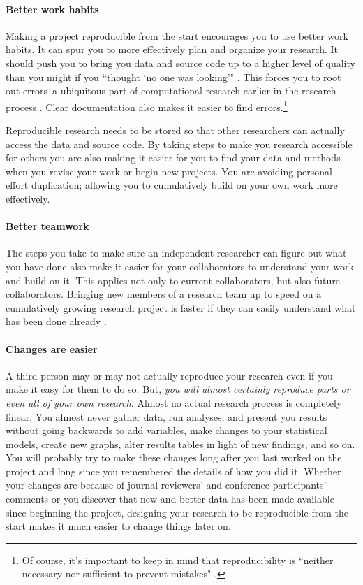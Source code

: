 \documentclass[krantz1]{krantz}
\begin{document}
\paragraph{Better work habits}
Making a project reproducible from the start encourages you to use better work habits. It can spur you to more effectively plan and organize your research. It should push you to bring you data and source code up to a higher level of quality than you might if you ``thought `no one was looking'" \cite[386]{Donohue2010}. This forces you to root out errors--a ubiquitous part of computational research-earlier in the research process \cite[385]{Donohue2010}. Clear documentation also makes it easier to find errors.\footnote{Of course, it's important to keep in mind that reproducibility is ``neither necessary nor sufficient to prevent mistakes" \cite[]{Stodden2009b}.}

Reproducible research needs to be stored so that other researchers can actually access the data and source code. By taking steps to make you research accessible for others you are also making it easier for you to find your data and methods when you revise your work or begin new projects. You are avoiding personal effort duplication; allowing you to cumulatively build on your own work more effectively.

\paragraph{Better teamwork}
The steps you take to make sure an independent researcher can figure out what you have done also make it easier for your collaborators to understand your work and build on it. This applies not only to current collaborators, but also future collaborators. Bringing new members of a research team up to speed on a cumulatively growing research project is faster if they can easily understand what has been done already \cite[386]{Donohue2010}. 

\paragraph{Changes are easier}
A third person may or may not actually reproduce your research even if you make it easy for them to do so. But, {\emph{you will almost certainly reproduce parts or even all of your own research}}. Almost no actual research process is completely linear. You almost never gather data, run analyses, and present you results without going backwards to add variables, make changes to your statistical models, create new graphs, alter results tables in light of new findings, and so on. You will probably try to make these changes long after you last worked on the project and long since you remembered the details of how you did it. Whether your changes are because of journal reviewers' and conference participants' comments or you discover that new and better data has been made available since beginning the project, designing your research to be reproducible from the start makes it much easier to change things later on.  
\end{document}
